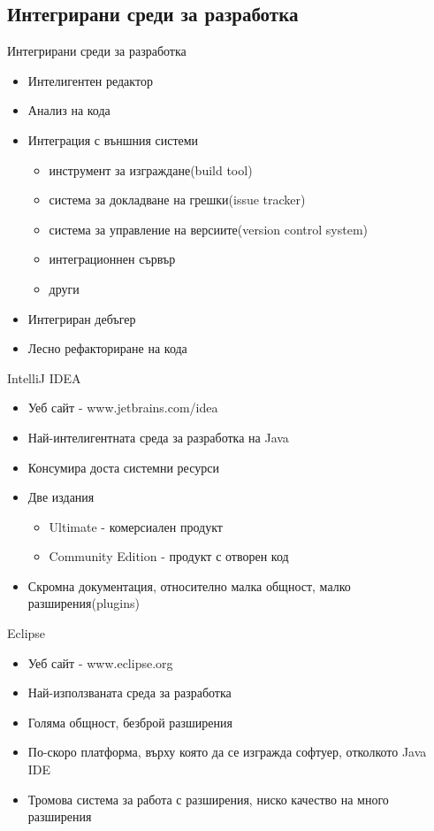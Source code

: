 \documentclass{beamer}
\begin{document}
\subsection{Интегрирани среди за разработка}
\begin{frame}{Интегрирани среди за разработка}
  \transdissolve  
  \begin{itemize}
    \item Интелигентен редактор \pause
    \item Анализ на кода \pause
    \item Интеграция с външния системи \pause
      \begin{itemize}
        \item инструмент за изграждане(build tool) \pause
        \item система за докладване на грешки(issue tracker) \pause
        \item система за управление на версиите(version control
          system) \pause
        \item интеграционнен сървър \pause
        \item други
      \end{itemize}
      \pause
    \item Интегриран дебъгер \pause
    \item Лесно рефакториране на кода
  \end{itemize}
\end{frame}

\begin{frame}{IntelliJ IDEA}
  \transdissolve
  \begin{itemize}
    \item Уеб сайт - www.jetbrains.com/idea
    \item Най-интелигентната среда за
    разработка на Java
    \item Консумира доста системни ресурси
    \item Две издания
      \begin{itemize}
        \item Ultimate - комерсиален продукт
        \item Community Edition - продукт с отворен код
      \end{itemize}
    \item Скромна документация, относително малка общност,
    малко разширения(plugins)
  \end{itemize}
\end{frame}

\begin{frame}{Eclipse}
  \transdissolve
  \begin{itemize}
    \item Уеб сайт - www.eclipse.org
    \item Най-използваната среда за разработка
    \item Голяма общност, безброй разширения
    \item По-скоро платформа, върху която да се
    изгражда софтуер, отколкото Java IDE
    \item Тромова система за работа с
    разширения, ниско качество на много
    разширения
  \end{itemize}
\end{frame}
\end{document}
